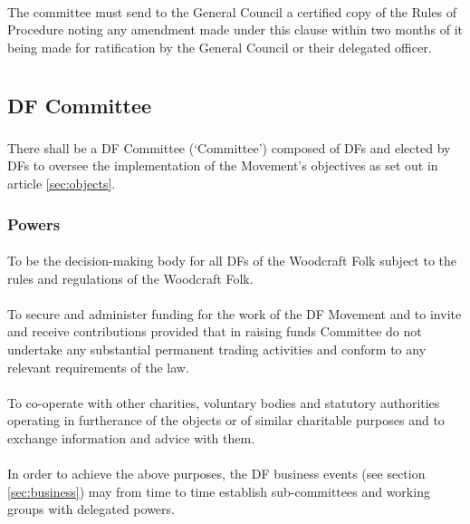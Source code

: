 \documentclass[a4paper, 12pt]{report}
\begin{document}
\subsubsection{}
The committee must send to the General Council a certified copy of the Rules of Procedure noting any amendment made under this clause within two months of it being made for ratification by the General Council or their delegated officer.

\chapter{}
\section{DF Committee}
\subsection{}
There shall be a DF Committee (`Committee') composed of DFs and elected by DFs to oversee the implementation of the Movement's objectives as set out in article \ref{sec:objects}.

\subsection{Powers}
\subsubsection{}
To be the decision-making body for all DFs of the Woodcraft Folk subject to the rules and regulations of the Woodcraft Folk.
\subsubsection{}
To secure and administer funding for the work of the DF Movement and to invite and receive contributions provided that in raising funds Committee do not undertake any substantial permanent trading activities and conform to any relevant requirements of the law.
\subsubsection{}
To co-operate with other charities, voluntary bodies and statutory authorities operating in furtherance of the objects or of similar charitable purposes and to exchange information and advice with them.
\subsubsection{}
In order to achieve the above purposes, the DF business events (see section \ref{sec:business}) may from time to time establish sub-committees and working groups with delegated powers.
\end{document}
